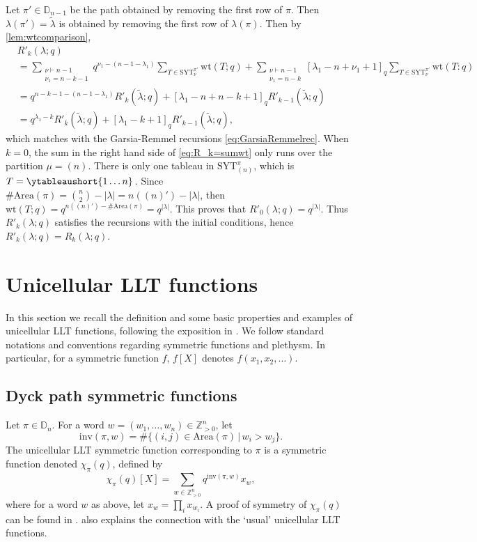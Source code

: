 \documentclass[12pt,reqno]{amsart}
\theoremstyle{plain}
\theoremstyle{definition}
\theoremstyle{remark}
\theoremstyle{example}
\numberwithin{equation}{section}
\newcommand\ZZ{\mathbb{Z}}
\newcommand\inv{\mathrm{inv}}
\newcommand{\SYT}{\mathrm{SYT}}
\newcommand{\wt}{\mathrm{wt}}
\newcommand{\Area}{\mathrm{Area}}
\newcommand{\DD}{\mathbb{D}}
\begin{document}
	Let $\pi' \in \DD_{n-1}$ be the path obtained by removing the first row of $\pi$. Then  $\lambda(\pi') = \widetilde{\lambda}$ is obtained by removing the first row of $\lambda(\pi)$.  Then by \autoref{lem:wtcomparison}, \begin{align*}
		&R'_k(\lambda;q) 
		\\
		&= \sum_{\substack{\nu \vdash n-1 \\ \nu_1 = n-k-1}} q^{\nu_1 - (n-1-\lambda_1)} \sum_{T \in \SYT^{\pi'}_\nu} \wt(T;q) + \sum_{\substack{\nu \vdash n-1 \\ \nu_1 = n-k}} [\lambda_1-n+\nu_1+1]_q \sum_{T \in \SYT^{\pi'}_\nu} \wt(T:q)
		\\
		&=  q^{n-k-1 - (n-1-\lambda_1)} R'_{k}(\widetilde{\lambda};q) +  [\lambda_1-n+n-k+1]_q R'_{k-1}(\widetilde{\lambda};q)
		\\
		&= q^{\lambda_1-k} R'_{k}(\widetilde{\lambda};q) +  [\lambda_1-k+1]_q R'_{k-1}(\widetilde{\lambda};q),
	\end{align*} which matches with the Garsia-Remmel recursions \eqref{eq:GarsiaRemmelrec}. When $k=0$, the sum in the right hand side of \eqref{eq:R_k=sumwt} only runs over the partition $\mu = (n)$. There is only one tableau in $\SYT^\pi_{(n)}$, which is $ T = \ytableaushort{1\ldots n}$\,. Since $\# \Area(\pi) = \binom{n}{2} - |\lambda| = n((n)') - |\lambda|$, then $\wt(T;q) = q^{n((n)')-\# \Area(\pi)} = q^{|\lambda|}$. This proves that $R'_0(\lambda;q) = q^{|\lambda|}$. Thus $R'_k(\lambda;q)$ satisfies the recursions with the initial conditions, hence $R'_k(\lambda;q) = R_k(\lambda;q)$.


\section{Unicellular LLT functions}

In this section we recall the definition and some basic properties and examples of unicellular LLT functions, following the exposition in \cite{Carlsson-Mellit-Shuffle}. We follow standard notations and conventions regarding symmetric functions and plethysm. In particular, for a symmetric function $f$, $f[X]$ denotes $f(x_1,x_2,\ldots)$.

\subsection{Dyck path symmetric functions}

Let $\pi \in \DD_n$. For a word $w = (w_1,\ldots,w_n) \in \ZZ_{>0}^n$, let $$ \inv(\pi,w) = \#\{(i,j)\in \Area(\pi)\,|\, w_i>w_j\}.$$ The unicellular LLT symmetric function corresponding to $\pi$ is a symmetric function denoted $\chi_\pi(q)$, defined by $$ \chi_\pi(q)[X] = \sum_{w \in \ZZ_{>0}^n}^{} q^{\inv(\pi,w)} x_w,$$ where for a word $w$ as above, let $x_w = \prod_{i} x_{w_i}$. A proof of symmetry of $\chi_\pi(q)$ can be found in \cite[Proposition 3.2]{Carlsson-Mellit-Shuffle}. \cite[Remark 3.6]{Carlsson-Mellit-Shuffle} also explains the connection with the `usual' unicellular LLT functions.
\end{document}
